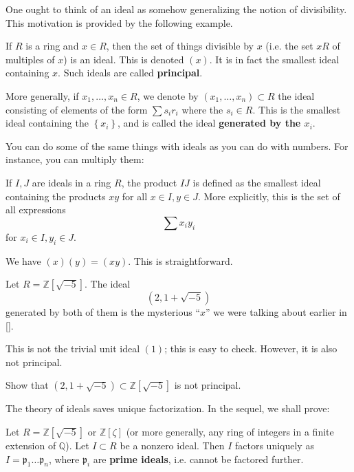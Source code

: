 One ought to think of an ideal as somehow generalizing the notion of
divisibility. This motivation is provided by the following example.

\begin{example}
If $R$ is a ring and $x \in R$, then the set of things divisible by $x$ (i.e.
the set $xR$ of multiples of $x$) is an ideal. This is denoted $(x)$. It is in
fact the smallest ideal containing $x$. Such ideals are called
\textbf{principal}.

More generally, if $x_1, \dots, x_n \in R$, we denote by $(x_1, \dots, x_n)
\subset R$ the ideal consisting of elements of the form $\sum s_i r_i$ where
the $s_i \in R$. This is the smallest ideal containing the
$\left\{x_i\right\}$, and is called the ideal \textbf{generated by the $x_i$}.
\end{example}

You can do some of the same things with ideals as you can do with numbers. For
instance, you can multiply them:

\begin{definition}
If $I, J$ are ideals in a ring $R$, the product $IJ$ is defined as the smallest
ideal containing the products $xy$ for all $x \in I, y \in J$. More explicitly,
this is the set of all expressions
  \[ \sum x_i y_i \]
for $x_i \in I, y_i \in J$.
\end{definition}

\begin{example}
We have $(x)(y) = (xy)$. This is straightforward.
\end{example}

\begin{example}
Let $R = \mathbb{Z}[\sqrt{-5}]$. The ideal
  \[ (2, 1+\sqrt{-5}) \]
generated by both of them is the mysterious ``$x$'' we were talking about
earlier in \ref{}.

This is not the trivial unit ideal $(1)$; this is easy to check. However, it is
also not principal.
\end{example}

\begin{exercise}
Show that $(2, 1 + \sqrt{-5}) \subset \mathbb{Z}[\sqrt{-5}]$ is not principal.
\end{exercise}

The theory of ideals saves unique factorization. In the sequel, we shall prove:

\begin{theorem}[Dedekind]\label{ded1}
Let $R = \mathbb{Z}[\sqrt{-5}]$ or $\mathbb{Z}[\zeta]$ (or more generally, any
ring of integers in a finite extension of $\mathbb{Q}$). Let $I \subset R$ be
a nonzero ideal. Then $I$ factors uniquely as $I = \mathfrak{p}_1 \dots
\mathfrak{p}_n$, where $\mathfrak{p}_i$ are \textbf{prime ideals}, i.e. cannot
be factored further.
\end{theorem}

